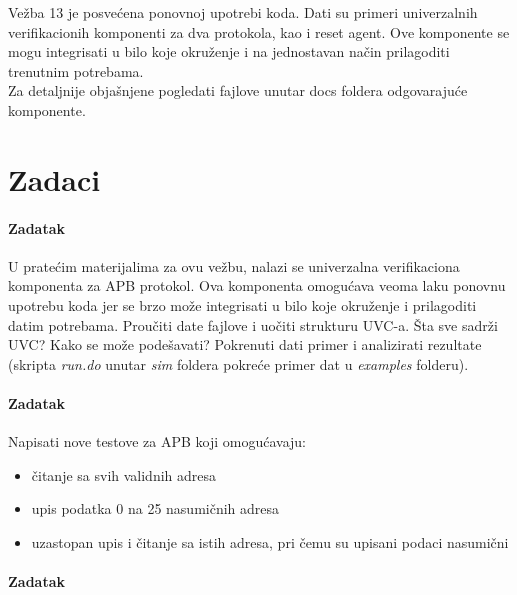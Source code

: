 %
% 

Vežba 13 je posvećena ponovnoj upotrebi koda. Dati su primeri univerzalnih
verifikacionih komponenti za dva protokola, kao i reset agent. Ove komponente se
mogu integrisati u bilo koje okruženje i na jednostavan način prilagoditi
trenutnim potrebama.\\

Za detaljnije objašnjene pogledati fajlove unutar docs foldera odgovarajuće
komponente.


\section{Zadaci}

\paragraph{Zadatak}

U pratećim materijalima za ovu vežbu, nalazi se univerzalna verifikaciona
komponenta za APB protokol. Ova komponenta omogućava veoma laku ponovnu upotrebu
koda jer se brzo može integrisati u bilo koje okruženje i prilagoditi datim
potrebama. Proučiti date fajlove i uočiti strukturu UVC-a. Šta sve sadrži UVC?
Kako se može podešavati? Pokrenuti dati primer i analizirati rezultate (skripta
\emph{run.do} unutar \emph{sim} foldera pokreće primer dat u \emph{examples}
folderu).

\paragraph{Zadatak}

Napisati nove testove za APB koji omogućavaju:

\begin{itemize}
\item čitanje sa svih validnih adresa
\item upis podatka 0 na 25 nasumičnih adresa
\item uzastopan upis i čitanje sa istih adresa, pri čemu su upisani podaci
  nasumični
\end{itemize}

\paragraph{Zadatak}

